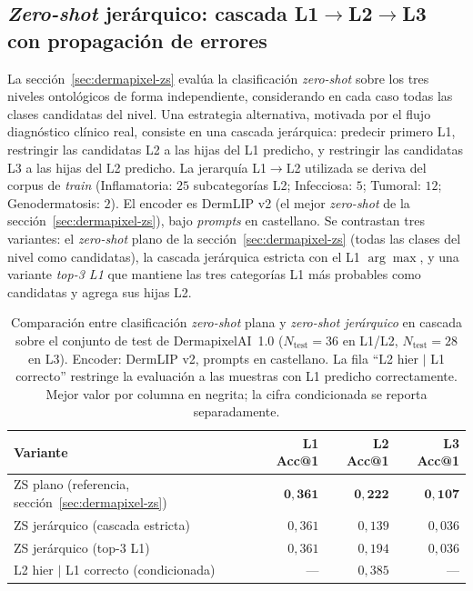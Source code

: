 \subsection*{\emph{Zero-shot} jerárquico: cascada L1$\to$L2$\to$L3
con propagación de errores}
\label{sec:dermapixel-extra-hierzs}

La secci\'on~\ref{sec:dermapixel-zs} evalúa la clasificación
\emph{zero-shot} sobre los tres niveles ontológicos de forma
independiente, considerando en cada caso todas las clases
candidatas del nivel. Una estrategia alternativa, motivada por el
flujo diagnóstico clínico real, consiste en una cascada
jerárquica: predecir primero L1, restringir las candidatas L2 a las
hijas del L1 predicho, y restringir las candidatas L3 a las hijas
del L2 predicho. La jerarquía L1$\to$L2 utilizada se deriva del
corpus de \emph{train} (Inflamatoria: $25$ subcategorías L2;
Infecciosa: $5$; Tumoral: $12$; Genodermatosis: $2$). El encoder
es DermLIP v2 (el mejor \emph{zero-shot} de la
secci\'on~\ref{sec:dermapixel-zs}), bajo \emph{prompts} en
castellano. Se contrastan tres variantes: el \emph{zero-shot}
plano de la secci\'on~\ref{sec:dermapixel-zs} (todas las clases del
nivel como candidatas), la cascada jerárquica estricta con el L1
$\arg\max$, y una variante \emph{top-3 L1} que mantiene las tres
categorías L1 más probables como candidatas y agrega sus hijas L2.

\begin{table}[H]
\centering
\footnotesize
\setlength{\tabcolsep}{4pt}
\renewcommand{\arraystretch}{0.95}
\caption{Comparación entre clasificación \emph{zero-shot} plana y
\emph{zero-shot jerárquico} en cascada sobre el conjunto de test de
DermapixelAI~1.0 ($N_{\mathrm{test}} = 36$ en L1/L2,
$N_{\mathrm{test}} = 28$ en L3). Encoder: DermLIP v2, prompts en
castellano. La fila ``L2 hier $|$ L1 correcto'' restringe la
evaluación a las muestras con L1 predicho correctamente. Mejor
valor por columna en negrita; la cifra condicionada se reporta
separadamente.}
\label{tab:dermapixel-extra-hierzs}
\begin{tabular}{lrrr}
\hline
Variante                                  & L1 Acc@1 & L2 Acc@1 & L3 Acc@1 \\
\hline
ZS plano (referencia, secci\'on~\ref{sec:dermapixel-zs}) & $\mathbf{0{,}361}$ & $\mathbf{0{,}222}$ & $\mathbf{0{,}107}$ \\
ZS jerárquico (cascada estricta)           & $0{,}361$          & $0{,}139$          & $0{,}036$ \\
ZS jerárquico (top-3 L1)                   & $0{,}361$          & $0{,}194$          & $0{,}036$ \\
\hline
L2 hier $|$ L1 correcto (condicionada)     & ---                & $0{,}385$          & --- \\
\hline
\end{tabular}
\end{table}

